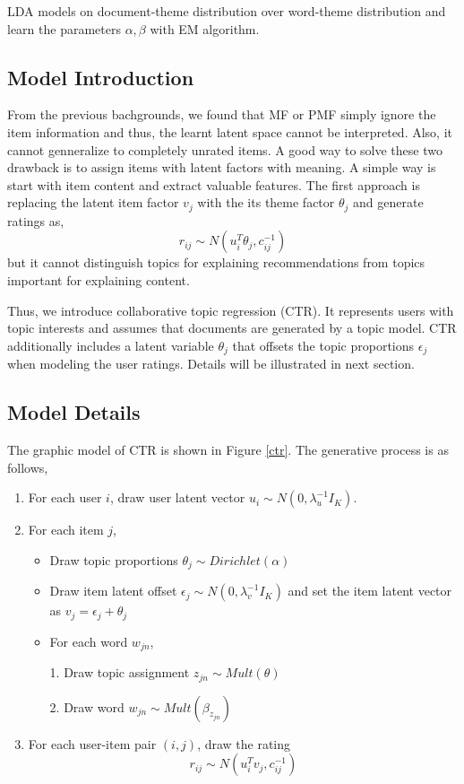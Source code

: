 \documentclass[11pt,a4paper]{article}
\begin{document}
LDA models on document-theme distribution over word-theme distribution and learn the parameters $\alpha, \beta$ with EM algorithm.

\subsection{Model Introduction}
From the previous bachgrounds, we found that MF or PMF simply ignore the item information and thus, the learnt latent space cannot be interpreted. Also, it cannot genneralize to completely unrated items. A good way to solve these two drawback is to assign items with latent factors with meaning. A simple way is start with item content and extract valuable features.
The first approach is replacing the latent item factor $v_j$ with the its theme factor $\theta_j$ and generate ratings as,
\[r_{ij} \sim N(u_i^T \theta_j, c_{ij}^{-1})\]
but it cannot distinguish topics for explaining recommendations from topics important for explaining content.

Thus, we introduce collaborative topic regression (CTR). It represents users
with topic interests and assumes that documents are generated by
a topic model. CTR additionally includes a latent variable $\theta_j$ that
offsets the topic proportions $\epsilon_j$ when modeling the user ratings. Details will be illustrated in next section.

\subsection{Model Details}
The graphic model of CTR is shown in Figure \ref{ctr}. The generative process is as follows,
\begin{enumerate}
  \item For each user $i$, draw user latent vector $u_i\sim N(0,\lambda_u^{-1}I_K)$.
  \item For each item $j$,

  \begin{itemize}
    \item Draw topic proportions $\theta_j \sim Dirichlet(\alpha)$
    \item Draw item latent offset $\epsilon_j \sim N(0, \lambda_v^{-1} I_K)$ and set the item latent vector as $v_j = \epsilon_j+\theta_j$
    \item For each word $w_{jn}$,

      1. Draw topic assignment $z_{jn}\sim Mult(\theta)$

      2. Draw word $w_{jn}\sim Mult(\beta_{z_{jn}})$
  \end{itemize}
  \item For each user-item pair $(i,j)$, draw the rating
  \[r_{ij} \sim N(u_i^T v_j, c_{ij}^{-1})\]
\end{enumerate}
\end{document}
